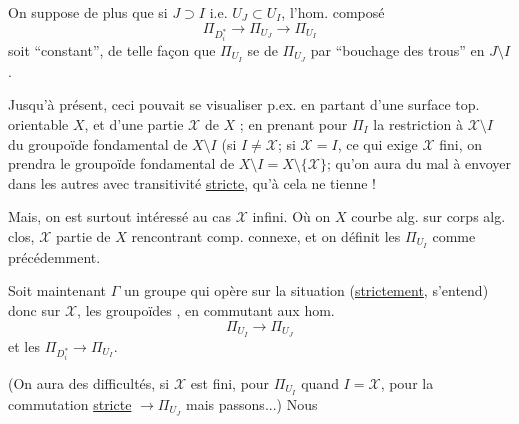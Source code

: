 On suppose de plus que si $J\supset I$ i.e. $U_J\subset U_I$,  l'hom. composé
\[
\Pi_{D_i^*}\longrightarrow\Pi_{U_J}\longrightarrow\Pi_{U_I}
\]
soit ``constant'', de telle façon que $\Pi_{U_I}$ se  de $\Pi_{U_J}$ par ``bouchage des trous'' en $J\setminus I$.

Jusqu'à présent,  ceci pouvait se visualiser p.ex. en partant d'une surface top. orientable  $X$, et d'une partie  $\mathcal{X}$ de $X$  ; en prenant pour $\Pi_I$ la restriction à $\mathcal{X}\setminus I$ du groupoïde fondamental de $X\setminus I$ (si $I\ne\mathcal{X}$; si $\mathcal{X}=I$, ce qui exige $\mathcal{X}$ fini, on prendra le groupoïde fondamental de $X\setminus I=X\setminus\{\mathcal{X}\}$; qu'on aura du mal à envoyer dans les autres avec transitivité \uline{stricte}, qu'à cela ne tienne !

Mais, on est surtout intéressé au cas $\mathcal{X}$ infini. Où on  $X$ courbe alg. sur
corps alg. clos, $\mathcal{X}$ partie de $X$ rencontrant  comp. connexe, et on définit les $\Pi_{U_I}$ comme précédemment.

Soit maintenant $\Gamma$ un groupe qui opère sur la situation (\uline{strictement}, s'entend) donc sur  $\mathcal{X}$,  les groupoïdes ,  en commutant aux hom. 
\[
\Pi_{U_I}\longrightarrow\Pi_{U_J}
\]
et les $\Pi_{D_i^*}\longrightarrow\Pi_{U_I}$.

(On aura des difficultés, si $\mathcal{X}$ est fini, pour $\Pi_{U_I}$ quand $I=\mathcal{X}$, pour la commutation \uline{stricte}  $\longrightarrow\Pi_{U_J}$  mais passons...)
Nous    

